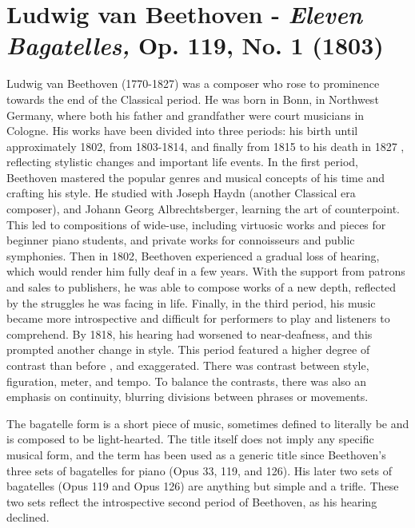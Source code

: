 \chapter[Beethoven's Eleven Bagatelles, Op. 119, No. 1]{Ludwig van Beethoven - \textit{Eleven Bagatelles,} Op. 119, No. 1 (1803)}\label{chapter:beethoven}

Ludwig van Beethoven (1770-1827) was a composer who rose to prominence towards the end of the Classical period. He was born in Bonn, in Northwest Germany, where both his father and grandfather were court musicians in Cologne. His works have been divided into three periods: his birth until approximately 1802, from 1803-1814, and finally from 1815 to his death in 1827 \autocite{Kerman_Tyson_Burnham_Johnson_Drabkin_2001}, reflecting stylistic changes and important life events. In the first period, Beethoven mastered the popular genres and musical concepts of his time and crafting his style. He studied with Joseph Haydn (another Classical era composer), and Johann Georg Albrechtsberger, learning the art of counterpoint. This led to compositions of wide-use, including virtuosic works and pieces for beginner piano students\autocite{Burkholder_Grout_Palisca_2014}, and private works for connoisseurs and public symphonies. Then in 1802, Beethoven experienced a gradual loss of hearing, which would render him fully deaf in a few years. With the support from patrons and sales to publishers, he was able to compose works of a new depth, reflected by the struggles he was facing in life. Finally, in the third period, his music became more introspective and difficult for performers to play and listeners to comprehend\autocite{Kerman_Tyson_Burnham_Johnson_Drabkin_2001}. By 1818, his hearing had worsened to near-deafness, and this prompted another change in style. This period featured a higher degree of contrast than before \autocite{Burkholder_Grout_Palisca_2014}, and exaggerated. There was contrast between style, figuration, meter, and tempo. To balance the contrasts, there was also an emphasis on continuity, blurring divisions between phrases or movements.

The bagatelle form is a short piece of music, sometimes defined to literally be  and is composed to be light-hearted\autocite{Brown_2001}. The title  itself does not imply any specific musical form, and the term has been used as a generic title since Beethoven's three sets of bagatelles for piano (Opus 33, 119, and 126). His later two sets of bagatelles (Opus 119 and Opus 126) are anything but simple and a trifle. These two sets reflect the introspective second period of Beethoven, as his hearing declined. 

